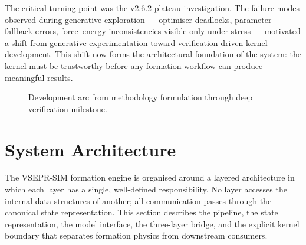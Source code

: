 \documentclass[11pt,twoside]{article}
\begin{document}
The critical turning point was the v2.6.2 plateau investigation. The failure modes observed during generative exploration --- optimiser deadlocks, parameter fallback errors, force--energy inconsistencies visible only under stress --- motivated a shift from generative experimentation toward verification-driven kernel development. This shift now forms the architectural foundation of the system: the kernel must be trustworthy before any formation workflow can produce meaningful results.

\begin{figure}[H]
\centering
{}
\caption{Development arc from methodology formulation through deep verification milestone.}
\label{fig:dev-arc}
\end{figure}


\section{System Architecture}
\label{sec:architecture}

The VSEPR-SIM formation engine is organised around a layered architecture in which each layer has a single, well-defined responsibility. No layer accesses the internal data structures of another; all communication passes through the canonical state representation. This section describes the pipeline, the state representation, the model interface, the three-layer bridge, and the explicit kernel boundary that separates formation physics from downstream consumers.
\end{document}
